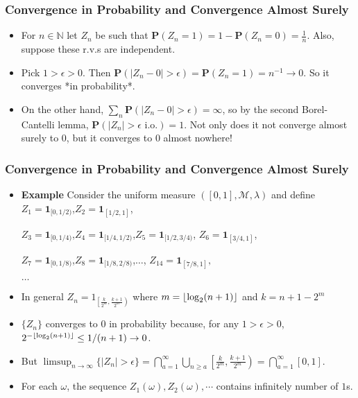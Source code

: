 \documentclass[handout]{beamer}
\DeclarePairedDelimiter\floor{\lfloor}{\rfloor}
\newcommand{\BP}{\mathbf{P}}
\newcommand{\BI}{\mathbf{1}}
\begin{document}
\frame
{
  \frametitle{Convergence in Probability and Convergence Almost Surely}

   \begin{itemize}
     
\item<2-> For $n \in \mathbb{N}$ let $Z_n$ be such that $\BP(Z_n = 1) = 1 - \BP(Z_n = 0) = \frac{1}{n}.$ Also, suppose these r.v.s are independent. 
   
\item<3-> Pick $1 > \epsilon > 0$. Then $\BP(|Z_n - 0| > \epsilon) = \BP(Z_n = 1) = n^{-1} \to 0$. So it converges *in probability*.

\item<3-> On the other hand, $\sum_n \BP(|Z_n - 0| > \epsilon) = \infty$, so by the second Borel-Cantelli lemma, $\BP(|Z_n| > \epsilon \text{ i.o.} ) = 1$. Not only does it not converge almost surely to $0$, but it converges to $0$ almost nowhere!
                                      
\end{itemize}
}

\frame
{
  \frametitle{Convergence in Probability and Convergence Almost Surely}

   \begin{itemize}
     
   \item<2-> \textbf{Example} Consider the uniform measure $([0,1],\mathcal{M}, \lambda)$ and define 
      $Z_1=\BI_{[0,1/2)}$,$Z_2=\BI_{[1/2,1]}$, 
      
      $Z_3=\BI_{[0,1/4)}$,$Z_4=\BI_{[1/4,1/2)}$,$Z_5=\BI_{[1/2,3/4)}$, $Z_6=\BI_{[3/4,1]}$,
      
      $Z_7=\BI_{[0,1/8)}$,$Z_8=\BI_{[1/8,2/8)}$,$\ldots$, $Z_{14}=\BI_{[7/8,1]},$
      
      $\ldots $
      
    \item<3->[-] In general $Z_n = 1_{\left[\frac{k}{2^m}, \frac{k+1}{2^m} \right)}$ where $m = \floor{\log_2(n + 1)}$ and $k = n + 1 - 2^m$
      
    \item<3->[-] $\{Z_n\}$ converges to $0$ in probability because, for any $1 > \epsilon > 0$, $2^{- \floor{\log_2(n + 1)}} \le 1/(n+1) \to 0$. 
    
    \item<4->[-] But $\limsup_{n \to \infty} \{|Z_n| > \epsilon\} = \bigcap_{a=1}^ \infty \bigcup_{n \ge a} \left[\frac{k}{2^m}, \frac{k+1}{2^m} \right) = \bigcap_{a=1}^ \infty [0,1]$.
    
    
    
    \item<5->[-] For each $\omega$, the sequence $Z_1(\omega), Z_2(\omega),\cdots$ contains infinitely number of $1$s. 
      
      
          
                                      
\end{itemize}
}
\end{document}
